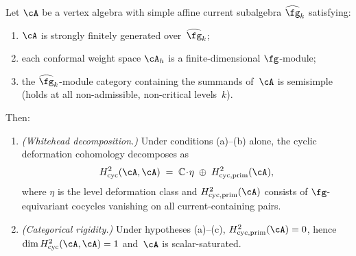 \begin{theorem}
\label{thm:cyclic-rigidity-generic}
Let\/ $\cA$ be a vertex algebra with simple affine current
subalgebra\/ $\widehat{\fg}_k$ satisfying:
\begin{enumerate}[label=\textup{(\alph*)}]
\item $\cA$ is strongly finitely generated
  over\/~$\widehat{\fg}_k$;
\item each conformal weight space $\cA_h$ is a
  finite-dimensional\/ $\fg$-module;
\item the\/ $\widehat{\fg}_k$-module category containing the
  summands of\/~$\cA$ is semisimple
  \textup{(}holds at all non-admissible, non-critical
  levels~$k$\textup{)}.
\end{enumerate}
Then:
\begin{enumerate}[label=\textup{(\roman*)}]
\item \emph{\textup{(}Whitehead decomposition.\textup{)}}
  Under conditions \textup{(a)--(b)} alone, the cyclic
  deformation cohomology decomposes as
  \begin{equation}\label{eq:whitehead-decomposition}
  H^2_{\mathrm{cyc}}(\cA, \cA)
  \;=\;
  \mathbb{C}\!\cdot\!\eta
  \;\oplus\;
  H^2_{\mathrm{cyc,prim}}(\cA),
  \end{equation}
  where\/ $\eta$ is the level deformation class and\/
  $H^2_{\mathrm{cyc,prim}}(\cA)$ consists of\/
  $\fg$-equivariant cocycles vanishing on all
  current-containing pairs.
\item \emph{\textup{(}Categorical rigidity.\textup{)}}
  Under hypotheses \textup{(a)--(c)},
  $H^2_{\mathrm{cyc,prim}}(\cA) = 0$,
  hence $\dim H^2_{\mathrm{cyc}}(\cA,\cA) = 1$
  and\/~$\cA$ is scalar-saturated.
\end{enumerate}
\end{theorem}

